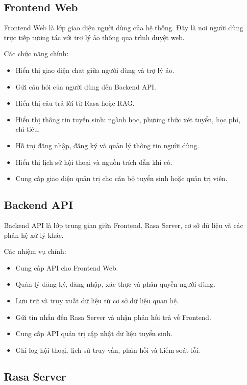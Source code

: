 \documentclass[12pt,a4paper]{report}
\begin{document}
\subsection{Frontend Web}

Frontend Web là lớp giao diện người dùng của hệ thống. Đây là nơi người dùng trực tiếp tương tác với trợ lý ảo thông qua trình duyệt web.

Các chức năng chính:
\begin{itemize}
    \item Hiển thị giao diện chat giữa người dùng và trợ lý ảo.
    \item Gửi câu hỏi của người dùng đến Backend API.
    \item Hiển thị câu trả lời từ Rasa hoặc RAG.
    \item Hiển thị thông tin tuyển sinh: ngành học, phương thức xét tuyển, học phí, chỉ tiêu.
    \item Hỗ trợ đăng nhập, đăng ký và quản lý thông tin người dùng.
    \item Hiển thị lịch sử hội thoại và nguồn trích dẫn khi có.
    \item Cung cấp giao diện quản trị cho cán bộ tuyển sinh hoặc quản trị viên.
\end{itemize}

\subsection{Backend API}

Backend API là lớp trung gian giữa Frontend, Rasa Server, cơ sở dữ liệu và các phân hệ xử lý khác.

Các nhiệm vụ chính:
\begin{itemize}
    \item Cung cấp API cho Frontend Web.
    \item Quản lý đăng ký, đăng nhập, xác thực và phân quyền người dùng.
    \item Lưu trữ và truy xuất dữ liệu từ cơ sở dữ liệu quan hệ.
    \item Gửi tin nhắn đến Rasa Server và nhận phản hồi trả về Frontend.
    \item Cung cấp API quản trị cập nhật dữ liệu tuyển sinh.
    \item Ghi log hội thoại, lịch sử truy vấn, phản hồi và kiểm soát lỗi.
\end{itemize}

\subsection{Rasa Server}
\end{document}
